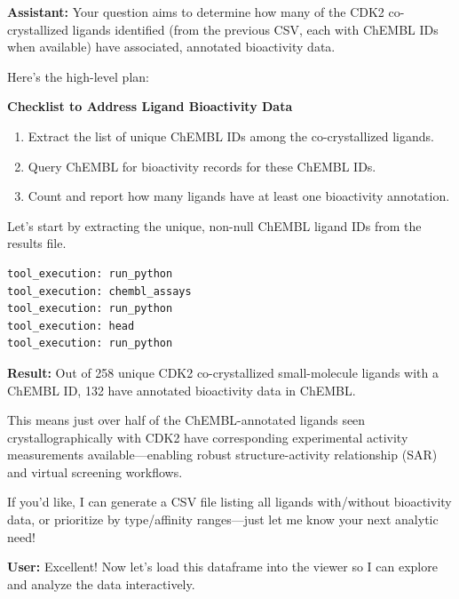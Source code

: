 \documentclass{article}
\begin{document}
\begin{assistantbox}
\textbf{Assistant:} Your question aims to determine how many of the CDK2 co-crystallized ligands identified (from the previous CSV, each with ChEMBL IDs when available) have associated, annotated bioactivity data.

Here's the high-level plan:

\textbf{Checklist to Address Ligand Bioactivity Data}
\begin{enumerate}[label=\arabic*.]
    \item Extract the list of unique ChEMBL IDs among the co-crystallized ligands.
    \item Query ChEMBL for bioactivity records for these ChEMBL IDs.
    \item Count and report how many ligands have at least one bioactivity annotation.
\end{enumerate}

Let's start by extracting the unique, non-null ChEMBL ligand IDs from the results file.
\begin{verbatim}
tool_execution: run_python
tool_execution: chembl_assays
tool_execution: run_python
tool_execution: head
tool_execution: run_python
\end{verbatim}
\textbf{Result:} Out of 258 unique CDK2 co-crystallized small-molecule ligands with a ChEMBL ID, 132 have annotated bioactivity data in ChEMBL.

This means just over half of the ChEMBL-annotated ligands seen crystallographically with CDK2 have corresponding experimental activity measurements available—enabling robust structure-activity relationship (SAR) and virtual screening workflows.

If you'd like, I can generate a CSV file listing all ligands with/without bioactivity data, or prioritize by type/affinity ranges—just let me know your next analytic need!
\end{assistantbox}

\vspace{1.5em}

\begin{userbox}
\textbf{User:} Excellent! Now let's load this dataframe into the viewer so I can explore and analyze the data interactively.
\end{userbox}
\end{document}
